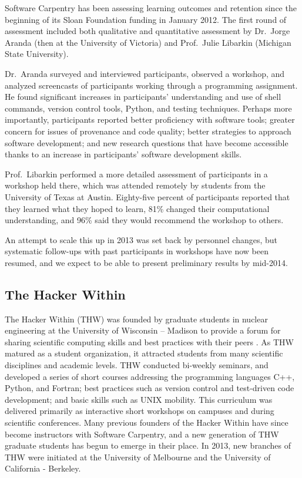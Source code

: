 \documentclass{proposalnsf}
\newlength{\up}
\begin{document}
Software Carpentry has been assessing learning outcomes and retention
since the beginning of its Sloan Foundation funding in January 2012.
The first round of assessment included both qualitative and
quantitative assessment by Dr.\ Jorge Aranda (then at the University
of Victoria) and Prof.\ Julie Libarkin (Michigan State University).

Dr.\ Aranda surveyed and interviewed participants, observed a
workshop, and analyzed screencasts of participants working through a
programming assignment. He found significant increases in
participants' understanding and use of shell commands, version control
tools, Python, and testing techniques. Perhaps more importantly,
participants reported better proficiency with software tools; greater
concern for issues of provenance and code quality; better strategies
to approach software development; and new research questions that have
become accessible thanks to an increase in participants' software
development skills.

Prof.\ Libarkin performed a more detailed assessment of participants
in a workshop held there, which was attended remotely by students from
the University of Texas at Austin. Eighty-five percent of participants reported that
they learned what they hoped to learn, 81\% changed their
computational understanding, and 96\% said they would recommend the
workshop to others.

An attempt to scale this up in 2013 was set back by personnel changes,
but systematic follow-ups with past participants in workshops have now
been resumed, and we expect to be able to present preliminary results
by mid-2014.

\subsection{The Hacker Within}
\label{sec:THW}

The Hacker Within (THW) was founded by graduate students in nuclear
engineering at the University of Wisconsin -- Madison to provide a
forum for sharing scientific computing skills and best practices with
their peers \cite{huff2011}. As THW matured as a student organization,
it attracted students from many scientific disciplines and academic
levels. THW conducted bi-weekly seminars, and developed a series of
short courses addressing the programming languages C++, Python, and
Fortran; best practices such as version control and test-driven code
development; and basic skills such as UNIX mobility. This curriculum
was delivered primarily as interactive short workshops on campuses and
during scientific conferences. Many previous founders of the Hacker
Within have since become instructors with Software Carpentry, and a
new generation of THW graduate students has begun to emerge in their
place. In 2013, new branches of THW were initiated at the University
of Melbourne and the University of California - Berkeley.
\end{document}
